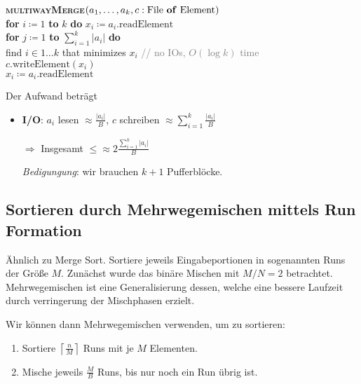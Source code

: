 \begin{pseudocode}
  \textbf{\textsc{multiwayMerge}}\( (a_1,\dots,a_k,c : \text{File \textbf{of} Element}) \) \\
  \phantom{\enskip} \textbf{for} \( i \coloneqq 1 \) \textbf{to} \( k \) \textbf{do} \( x_i \coloneqq a_i\text{.readElement} \) \\
  \phantom{\enskip} \textbf{for} \( j \coloneqq 1 \) \textbf{to} \( \sum_{i=1}^k \left\vert a_i \right\vert \) \textbf{do} \\
  \phantom{\enskip} \phantom{\enskip} find \( i \in 1\dots k \) that minimizes \( x_i \) \enskip{} \textcolor{gray}{// no IOs, \( O(\log k) \) time} \\
  \phantom{\enskip} \phantom{\enskip} \( c\text{.writeElement}(x_i) \) \\
  \phantom{\enskip} \phantom{\enskip} \( x_i \coloneqq a_i\text{.readElement} \)
\end{pseudocode}

Der Aufwand beträgt

\begin{itemize}
  \item \textbf{I/O}: \( a_i \) lesen \( \approx \frac{\left\vert a_i \right\vert}{B} \), \( c \) schreiben \( \approx \sum_{i=1}^k \frac{\left\vert a_i \right\vert}{B} \)

  \( \Rightarrow \) Insgesamt \( \leq \approx 2\frac{\sum_{i=1}^k \left\vert a_i \right\vert}{B} \)

  \emph{Bedigungung}: wir brauchen \( k+1 \) Pufferblöcke.
\end{itemize}

\subsection{Sortieren durch Mehrwegemischen mittels Run Formation}
Ähnlich zu Merge Sort. Sortiere jeweils Eingabeportionen in sogenannten Runs der Größe $M$. Zunächst wurde das binäre Mischen mit $M/N = 2$ betrachtet. Mehrwegemischen ist eine Generalisierung dessen, welche eine bessere Laufzeit durch verringerung der Mischphasen erzielt.
 
Wir können dann Mehrwegemischen verwenden, um zu sortieren: 

\begin{enumerate}
  \item Sortiere \( \left\lceil \tfrac{n}{M} \right\rceil \) Runs mit je \( M \) Elementen.
  \item Mische jeweils \( \tfrac{M}{B} \) Runs, bis nur noch ein Run übrig ist.
\end{enumerate}


